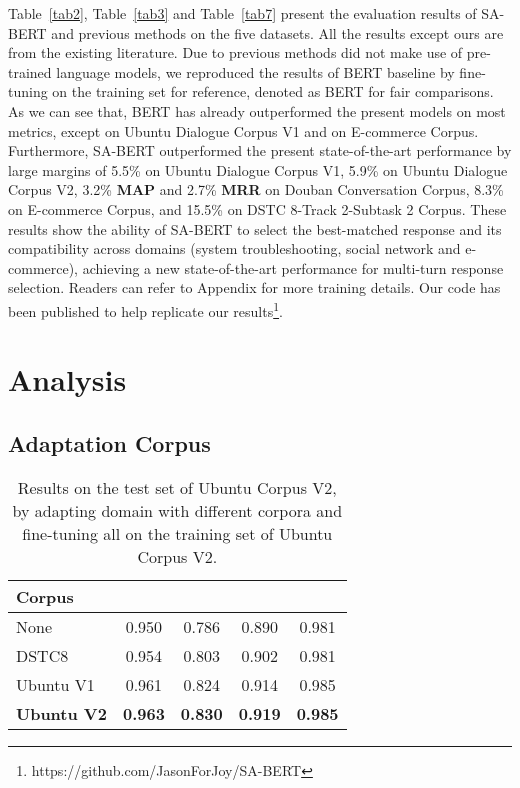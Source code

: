 \documentclass[sigconf]{acmart}
\begin{document}
    Table~\ref{tab2}, Table~\ref{tab3} and Table~\ref{tab7} present the evaluation results of SA-BERT and previous methods on the five datasets.
    All the results except ours are from the existing literature.
    Due to previous methods did not make use of pre-trained language models, we reproduced the results of BERT baseline by fine-tuning on the training set for reference, denoted as BERT for fair comparisons.
    As we can see that, BERT has already outperformed the present models on most metrics, except  on Ubuntu Dialogue Corpus V1 and  on E-commerce Corpus.
    Furthermore, SA-BERT outperformed the present state-of-the-art performance by large margins of
    5.5\%  on Ubuntu Dialogue Corpus V1,
    5.9\%  on Ubuntu Dialogue Corpus V2,
    3.2\% \textbf{MAP} and 2.7\% \textbf{MRR} on Douban Conversation Corpus,
    8.3\%  on E-commerce Corpus,
    and 15.5\%  on DSTC 8-Track 2-Subtask 2 Corpus. 
These results show the ability of SA-BERT to select the best-matched response and its compatibility across domains (system troubleshooting, social network and e-commerce), achieving a new state-of-the-art performance for multi-turn response selection.
Readers can refer to Appendix for more training details. 
    Our code has been published to help replicate our results\footnote{https://github.com/JasonForJoy/SA-BERT}.
    

\section{Analysis}

  \subsection{Adaptation Corpus}
  
    \begin{table}[!hbt]
\caption{Results on the test set of Ubuntu Corpus V2, by adapting domain with different corpora and fine-tuning all on the training set of Ubuntu Corpus V2.}
      \centering
      \begin{tabular}{lcccc}
      \toprule
       Corpus                &  &  &  &  \\
      \midrule
       None                  & 0.950 & 0.786 & 0.890 & 0.981  \\
       DSTC8                 & 0.954 & 0.803 & 0.902 & 0.981  \\
       Ubuntu V1             & 0.961 & 0.824 & 0.914 & 0.985  \\
       \textbf{Ubuntu V2}    & \textbf{0.963} & \textbf{0.830} & \textbf{0.919} & \textbf{0.985}  \\
      \bottomrule
      \end{tabular}
      \label{tab4}
    \end{table}
    
\end{document}
